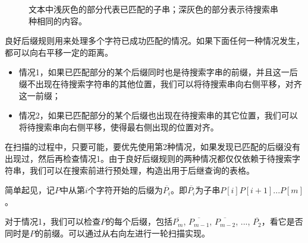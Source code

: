 \documentclass[UTF8]{article}
\begin{document}
\begin{figure}[htbp]
 \centering
  \hspace{.01\textwidth}
 \caption{文本中浅灰色的部分代表已匹配的子串；深灰色的部分表示待搜索串种相同的内容。}
 \label{fig:good-suffix-cases}
\end{figure}

良好后缀规则用来处理多个字符已成功匹配的情况。如果下面任何一种情况发生，都可以向右平移一定的距离。

\begin{itemize}
\item 情况1，如果已匹配部分的某个后缀同时也是待搜索字串的前缀，并且这一后缀不出现在待搜索字符串的其他位置，我们可以将待搜索串向右侧平移，对齐这一前缀；
\item 情况2，如果已匹配部分的某个后缀也出现在待搜索串的其它位置，我们可以将待搜索串向右侧平移，使得最右侧出现的位置对齐。
\end{itemize}

在扫描的过程中，只要可能，要优先使用第2种情况，如果发现已匹配的后缀没有出现过，然后再检查情况1。由于良好后缀规则的两种情况都仅仅依赖于待搜索字符串，我们可以在搜索前进行预处理，构造出用于后继查询的表格。

简单起见，记$P$中从第$i$个字符开始的后缀为$\overline{P_i}$。即$\overline{P_i}$为子串$P[i]P[i+1]...P[m]$。

对于情况1，我们可以检查$P$的每个后缀，包括$\overline{P_m}$, $\overline{P_{m-1}}$, $\overline{P_{m-2}}$, ...,  $\overline{P_2}$，看它是否同时是$P$的前缀。可以通过从右向左进行一轮扫描实现。
\end{document}
